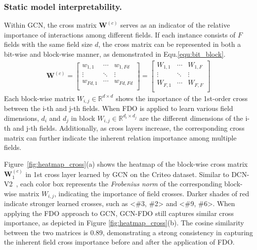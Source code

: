\documentclass[sigconf]{acmart}
\begin{document}
\subsubsection{Static model interpretability.}
Within GCN, the cross matrix $\mathbf{W}^{(c)}$ serves as an indicator of the relative importance of interactions among different fields. If each instance consists of $F$ fields with the same field size $d$, the cross matrix can be represented in both a bit-wise and block-wise manner, as demonstrated in Equ.\ref{equ:bit_block}.
\begin{align}
\textstyle
\label{equ:bit_block}
\mathbf{W}^{\left( c \right)}=\left[ \begin{matrix}
	w_{1,1}&		\cdots&		w_{1,Fd}\\
	\vdots&		\ddots&		\vdots\\
	w_{Fd,1}&		\cdots&		w_{Fd,Fd}\\
\end{matrix} \right] =\left[ \begin{matrix}
	W_{1,1}&		\cdots&		W_{1,F}\\
	\vdots&		\ddots&		\vdots\\
	W_{F,1}&		\cdots&		W_{F,F}\\
\end{matrix} \right] 
\end{align}
Each block-wise matrix $W_{i,j} \in \mathbb{R}^{d\times d}$ shows the importance of the 1st-order cross between the i-th and j-th fields. When FDO is applied to learn various field dimensions, $d_i$ and $d_j$ in block $W_{i,j} \in \mathbb{R}^{d_i\times d_j}$ are the different dimensions of the i-th and j-th fields. Additionally, as cross layers increase, the corresponding cross matrix can further indicate the inherent relation importance among multiple fields. 

Figure~\ref{fig:heatmap_cross}(a) shows the heatmap of the block-wise cross matrix $\mathbf{W}_1^{(c)}$ in 1st cross layer learned by GCN on the Criteo dataset. Similar to DCN-V2~\cite{wang2021dcnm}, each color box represents the \textit{Frobenius norm} of the corresponding block-wise matrix $W_{i,j}$, indicating the importance of field crosses. Darker shades of red indicate stronger learned crosses, such as <\#3, \#2> and <\#9, \#6>. When applying the FDO approach to GCN, GCN-FDO still captures similar cross importance, as depicted in Figure \ref{fig:heatmap_cross}(b). The cosine similarity between the two matrices is 0.89, demonstrating a strong consistency in capturing the inherent field cross importance before and after the application of FDO. 
\end{document}
